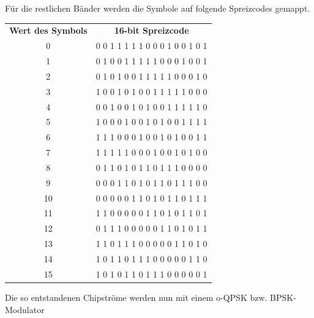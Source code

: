 Für die restlichen Bänder werden die Symbole auf folgende Spreizcodes gemappt. \cite[S.414]{ieee154}
\begin{center}
	\begin{tabular}{cc}
		\textbf{Wert des Symbols} & \textbf{16-bit Spreizcode} \\
		0&0 0 1 1 1 1 1 0 0 0 1 0 0 1 0 1\\
		1&0 1 0 0 1 1 1 1 1 0 0 0 1 0 0 1\\
		2&0 1 0 1 0 0 1 1 1 1 1 0 0 0 1 0\\
		3&1 0 0 1 0 1 0 0 1 1 1 1 1 0 0 0\\
		4&0 0 1 0 0 1 0 1 0 0 1 1 1 1 1 0\\
		5&1 0 0 0 1 0 0 1 0 1 0 0 1 1 1 1\\
		6&1 1 1 0 0 0 1 0 0 1 0 1 0 0 1 1\\
		7&1 1 1 1 1 0 0 0 1 0 0 1 0 1 0 0\\
		8&0 1 1 0 1 0 1 1 0 1 1 1 0 0 0 0\\
		9&0 0 0 1 1 0 1 0 1 1 0 1 1 1 0 0\\
		10&0 0 0 0 0 1 1 0 1 0 1 1 0 1 1 1\\
		11&1 1 0 0 0 0 0 1 1 0 1 0 1 1 0 1\\
		12&0 1 1 1 0 0 0 0 0 1 1 0 1 0 1 1\\
		13&1 1 0 1 1 1 0 0 0 0 0 1 1 0 1 0\\
		14&1 0 1 1 0 1 1 1 0 0 0 0 0 1 1 0\\
		15&1 0 1 0 1 1 0 1 1 1 0 0 0 0 0 1\\
	\end{tabular}
\end{center}

Die so entstandenen Chipströme werden nun mit einem o-QPSK bzw. BPSK-Modulator 
 

